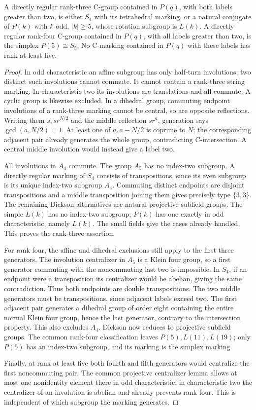 \begin{lemma}\label{E.RegularSubgroups}
A directly regular rank-three C-group contained in $P(q)$, with both
labels greater than two, is either $S_4$ with its tetrahedral marking,
or a natural conjugate of $P(k)$ with $k$ odd, $|k|\ge5$, whose rotation
subgroup is $L(k)$. A directly regular rank-four C-group contained in
$P(q)$, with all labels greater than two, is the simplex $P(5)\cong S_5$.
No C-marking contained in $P(q)$ with these labels has rank at least five.
\end{lemma}
\begin{proof}
In odd characteristic an affine subgroup has only half-turn involutions;
two distinct such involutions cannot commute. It cannot contain a
rank-three string marking. In characteristic two its involutions are
translations and all commute. A cyclic group is likewise excluded.
In a dihedral group, commuting endpoint involutions of a rank-three
marking cannot be central, so are opposite reflections. Writing them
$s,sr^{N/2}$ and the middle reflection $sr^a$, generation says
$\gcd(a,N/2)=1$. At least one of $a,a-N/2$ is coprime to $N$; the
corresponding adjacent pair already generates the whole group,
contradicting C-intersection. A central middle involution would instead
give a label two.

All involutions in $A_4$ commute. The group $A_5$ has no index-two
subgroup. A directly regular marking of $S_4$ consists of transpositions,
since its even subgroup is its unique index-two subgroup $A_4$.
Commuting distinct endpoints are disjoint transpositions and a middle
transposition joining them gives precisely type $\{3,3\}$.
The remaining Dickson alternatives are natural projective subfield groups.
The simple $L(k)$ has no index-two subgroup; $P(k)$ has one exactly in
odd characteristic, namely $L(k)$. The small fields give the cases already
handled. This proves the rank-three assertion.

For rank four, the affine and dihedral exclusions still apply to the
first three generators. The involution centralizer in $A_5$ is a Klein
four group, so a first generator commuting with the noncommuting last
two is impossible. In $S_4$, if an endpoint were a transposition its
centralizer would be abelian, giving the same contradiction. Thus both
endpoints are double transpositions. The two middle generators must be
transpositions, since adjacent labels exceed two. The first adjacent
pair generates a dihedral group of order eight containing the entire
normal Klein four group, hence the last generator, contrary to the
intersection property. This also excludes $A_4$.
Dickson now reduces to projective subfield groups. The common rank-four
classification leaves $P(5),L(11),L(19)$; only $P(5)$ has an index-two
subgroup, and its marking is the simplex marking.

Finally, at rank at least five both fourth and fifth generators would
centralize the first noncommuting pair. The common projective centralizer
lemma allows at most one nonidentity element there in odd characteristic;
in characteristic two the centralizer of an involution is abelian and
already prevents rank four. This is independent of which subgroup the
marking generates.
\end{proof}

